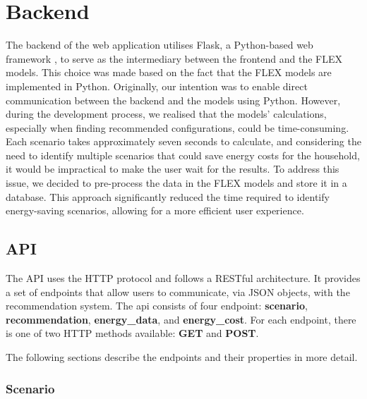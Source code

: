 \section{Backend}

The backend of the web application utilises Flask, a Python-based web framework \cite{flask}, to serve as the intermediary between the frontend and the FLEX models. 
This choice was made based on the fact that the FLEX models are implemented in Python. 
Originally, our intention was to enable direct communication between the backend and the models using Python. 
However, during the development process, we realised that the models' calculations, especially when finding recommended configurations, could be time-consuming. 
Each scenario takes approximately seven seconds to calculate, and considering the need to identify multiple scenarios that could save energy costs for the household, 
it would be impractical to make the user wait for the results. 
To address this issue, we decided to pre-process the data in the FLEX models and store it in a database. 
This approach significantly reduced the time required to identify energy-saving scenarios, allowing for a more efficient user experience.


\subsection{API}

The API uses the HTTP protocol and follows a RESTful architecture. 
It provides a set of endpoints that allow users to communicate, via JSON objects,
with the recommendation system.
The api consists of four endpoint: \textbf{scenario}, \textbf{recommendation}, \textbf{energy\_data}, and \textbf{energy\_cost}.
For each endpoint, there is one of two HTTP methods available: \textbf{GET} and \textbf{POST}.

The following sections describe the endpoints and their properties in more detail.


\subsubsection{Scenario}

